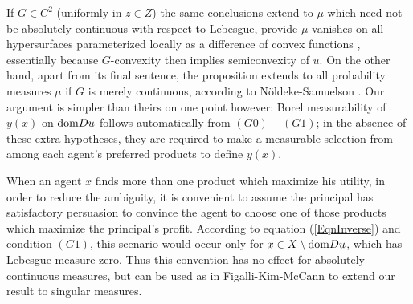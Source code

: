 \begin{remark}
	If $G \in C^2$ (uniformly in $z \in Z$) the same conclusions extend to $\mu$ which need not be absolutely
	continuous with respect to Lebesgue,  provide $\mu$ vanishes on all hypersurfaces parameterized 
	locally as a difference of convex functions \cite{FigalliKimMcCann11} \cite{Gigli11},  essentially because $G$-convexity then implies semiconvexity of $u$.  On the other hand,  apart from its final sentence,  
	the proposition extends to all probability measures $\mu$ if $G$ is merely continuous, according to 
	N\"oldeke-Samuelson \cite{NoldekeSamuelson15p}.  Our argument is simpler than
	theirs on one point however:  
	Borel measurability of $y(x)$ on ${\mathop{\rm dom}} Du$ follows automatically from $(G0)-(G1)$;
	in the absence of these extra hypotheses,  they are required to make a measurable selection from among each
	agent's preferred products to define $y(x)$.
\end{remark}
												
\begin{remark} 
	When an agent $x$ finds more than one product which maximize his utility, in order to reduce the ambiguity, it is convenient to assume the principal has satisfactory persuasion to  convince the agent to choose one of those products which maximize the principal's profit. 
	According to equation (\ref{EqnInverse}) and condition $(G1)$, this scenario would occur only for $x\in X \setminus {\mathop{\rm dom}} Du $, which has Lebesgue measure zero. Thus this convention has no effect for absolutely continuous measures, 
	but can be used as in Figalli-Kim-McCann \cite{FigalliKimMcCann11} to extend our result to singular measures.
\end{remark}
													
													
													
													
													
